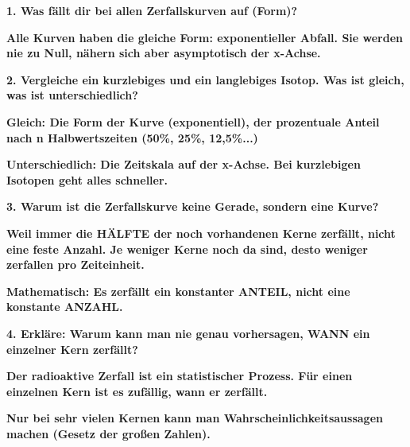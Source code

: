 \documentclass[10pt, a4paper]{article}
\newcommand{\lsg}[1]{\textcolor{loesung}{\textbf{#1}}}
\begin{document}
\textbf{1. Was fällt dir bei allen Zerfallskurven auf (Form)?}

\vspace{4pt}
\lsg{Alle Kurven haben die gleiche Form: exponentieller Abfall. Sie werden nie zu Null, nähern sich aber asymptotisch der x-Achse.}

\vspace{8pt}

\textbf{2. Vergleiche ein kurzlebiges und ein langlebiges Isotop. Was ist gleich, was ist unterschiedlich?}

\vspace{4pt}
\lsg{Gleich: Die Form der Kurve (exponentiell), der prozentuale Anteil nach n Halbwertszeiten (50\%, 25\%, 12,5\%...)}

\vspace{4pt}
\lsg{Unterschiedlich: Die Zeitskala auf der x-Achse. Bei kurzlebigen Isotopen geht alles schneller.}

\vspace{8pt}

\textbf{3. Warum ist die Zerfallskurve keine Gerade, sondern eine Kurve?}

\vspace{4pt}
\lsg{Weil immer die HÄLFTE der noch vorhandenen Kerne zerfällt, nicht eine feste Anzahl. Je weniger Kerne noch da sind, desto weniger zerfallen pro Zeiteinheit.}

\vspace{4pt}
\lsg{Mathematisch: Es zerfällt ein konstanter ANTEIL, nicht eine konstante ANZAHL.}

\vspace{8pt}

\textbf{4. Erkläre: Warum kann man nie genau vorhersagen, WANN ein einzelner Kern zerfällt?}

\vspace{4pt}
\lsg{Der radioaktive Zerfall ist ein statistischer Prozess. Für einen einzelnen Kern ist es zufällig, wann er zerfällt.}

\vspace{4pt}
\lsg{Nur bei sehr vielen Kernen kann man Wahrscheinlichkeitsaussagen machen (Gesetz der großen Zahlen).}
\end{document}
